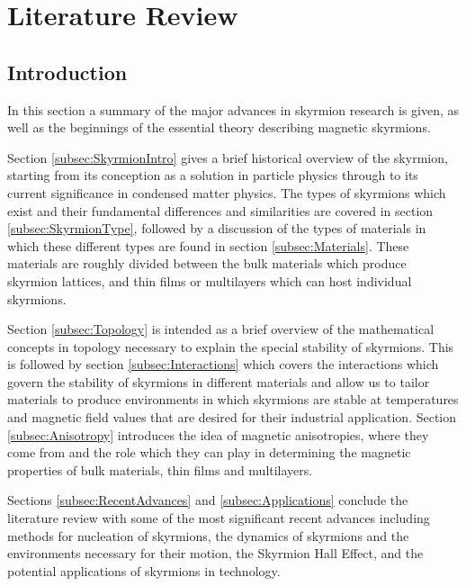 \chapter{Literature Review}\label{ch:LitRev}
\section{Introduction}\label{sec:LitRevIntro}
In this section a summary of the major advances in skyrmion research is given, as well as the beginnings of the essential theory describing magnetic skyrmions.

Section \ref{subsec:SkyrmionIntro} gives a brief historical overview of the skyrmion, starting from its conception as a solution in particle physics through to its current significance in condensed matter physics. The types of skyrmions which exist and their fundamental differences and similarities are covered in section \ref{subsec:SkyrmionType}, followed by a discussion of the types of materials in which these different types are found in section \ref{subsec:Materials}. These materials are roughly divided between the bulk materials which produce skyrmion lattices, and thin films or multilayers which can host individual skyrmions.

Section \ref{subsec:Topology} is intended as a brief overview of the mathematical concepts in topology necessary to explain the special stability of skyrmions. This is followed by section \ref{subsec:Interactions} which covers the interactions which govern the stability of skyrmions in different materials and allow us to tailor materials to produce environments in which skyrmions are stable at temperatures and magnetic field values that are desired for their industrial application. 
Section \ref{subsec:Anisotropy} introduces the idea of magnetic anisotropies, where they come from and the role which they can play in determining the magnetic properties of bulk materials, thin films and multilayers.

Sections \ref{subsec:RecentAdvances} and \ref{subsec:Applications} conclude the literature review with some of the most significant recent advances including methods for nucleation of skyrmions, the dynamics of skyrmions and the environments necessary for their motion, the Skyrmion Hall Effect, and the potential applications of skyrmions in technology.

